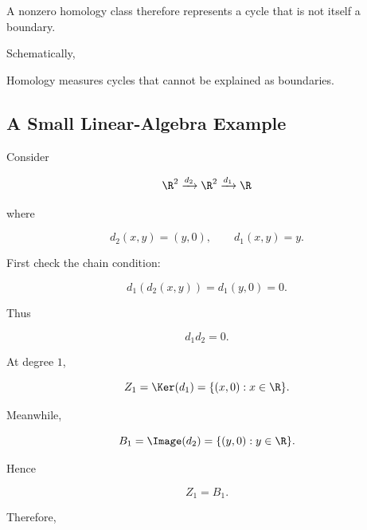 A nonzero homology class therefore represents a cycle that is not itself a
boundary.

Schematically,

\begin{center}
\end{center}

\begin{importantbox}
Homology measures cycles that cannot be explained as boundaries.
\end{importantbox}

\subsection{A Small Linear-Algebra Example}
\label{subsec:homology-linear-example}

Consider

\[ \R^2\xrightarrow{d_2}\R^2\xrightarrow{d_1}\R \]

where

\[ d_2(x,y)=(y,0),\qquad d_1(x,y)=y. \]

First check the chain condition:

\[ d_1(d_2(x,y))=d_1(y,0)=0. \]

Thus

\[ d_1d_2=0. \]

At degree \(1\),

\[ Z_1=\Ker(d_1)=\{(x,0):x\in\R\}. \]

Meanwhile,

\[ B_1=\Image(d_2)=\{(y,0):y\in\R\}. \]

Hence

\[ Z_1=B_1. \]

Therefore,

